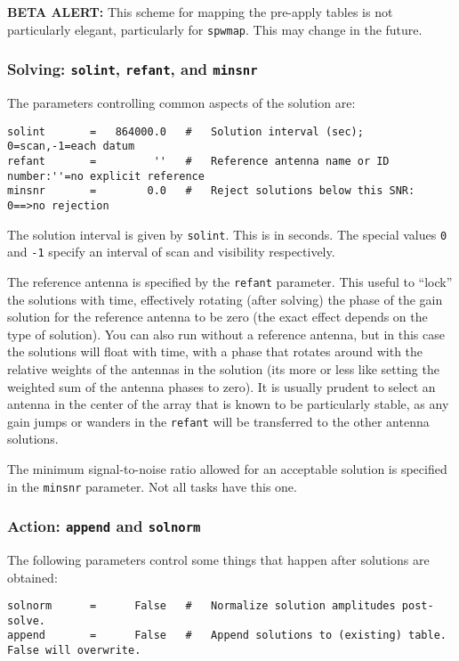 {\bf BETA ALERT:} This scheme for mapping the pre-apply tables is not
particularly elegant, particularly for {\tt spwmap}.  This may change
in the future.

\subsubsection{Solving: {\tt solint},
{\tt refant}, and {\tt minsnr} }
\label{section:cal.solve.pars.solving}

The parameters controlling common aspects of the solution are:
\small
\begin{verbatim}
solint       =   864000.0   #   Solution interval (sec); 0=scan,-1=each datum
refant       =         ''   #   Reference antenna name or ID number:''=no explicit reference
minsnr       =        0.0   #   Reject solutions below this SNR: 0==>no rejection
\end{verbatim} 
\normalsize

The solution interval is given by {\tt solint}.  This is in seconds.
The special values {\tt 0} and {\tt -1} specify an interval of scan
and visibility respectively.

The reference antenna is specified by the {\tt refant} parameter.
This useful to ``lock'' the solutions with time, effectively rotating
(after solving) the phase of the gain solution for the reference
antenna to be zero (the exact effect depends on the type of solution).
You can also run without a reference antenna, but in this case the
solutions will float with time, with a phase that rotates around with
the relative weights of the antennas in the solution (its more or less
like setting the weighted sum of the antenna phases to zero).  It is
usually prudent to select an antenna in the center of the array that
is known to be particularly stable, as any gain jumps or wanders in
the {\tt refant} will be transferred to the other antenna solutions.

The minimum signal-to-noise ratio allowed for an acceptable solution
is specified in the {\tt minsnr} parameter.  Not all tasks have this
one.

\subsubsection{Action: {\tt append} and {\tt solnorm} }
\label{section:cal.solve.pars.action}

The following parameters control some things that happen after
solutions are obtained:
\small
\begin{verbatim}
solnorm      =      False   #   Normalize solution amplitudes post-solve.
append       =      False   #   Append solutions to (existing) table.  False will overwrite.
\end{verbatim} 
\normalsize

